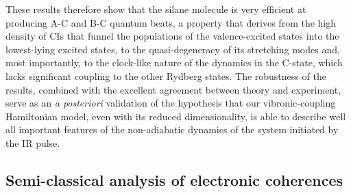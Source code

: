 \documentclass[12pt]{article}
\begin{document}
These results therefore show that the silane molecule is very efficient at producing A-C and B-C quantum beats, a property that derives from the high density of CIs that funnel the populations of the valence-excited states into the lowest-lying excited states, to the quasi-degeneracy of its stretching modes and, most importantly, to the clock-like nature of the dynamics in the C-state, which lacks significant coupling to the other Rydberg states. The robustness of the results, combined with the excellent agreement between theory and experiment, serve as an \textit{a posteriori} validation of the hypothesis that our vibronic-coupling Hamiltonian model, even with its reduced dimensionality, is able to describe well all important features of the non-adiabatic dynamics of the system initiated by the IR pulse. 

\subsection{Semi-classical analysis of electronic coherences} 
 
\end{document}
